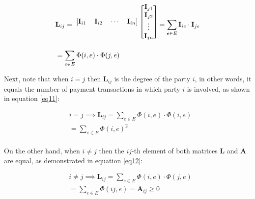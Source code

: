 \documentclass[12pt]{article}
\begin{document}
\begin{multicols}{2}
\begin{equation} \label{eq10}
    \begin{split}
    & \textbf{L}_{ij} = \begin{blockarray}{cccc}
    \begin{block}{[cccc]}
    \textbf{I}_{i1} & \textbf{I}_{i2} & \cdots & \textbf{I}_{in} \\ \end{block}
    \end{blockarray}
    \begin{blockarray}{c}
    \begin{block}{[c]}
    \textbf{I}_{j1} \\
    \textbf{I}_{j2} \\
    \vdots \\
    \textbf{I}_{jn} \\
    \end{block}
    \end{blockarray} = \sum_{e \in E} \textbf{I}_{ie} \cdot \textbf{I}_{je} \\
    & = \sum_{e \in E} \Phi(i, e) \cdot \Phi(j, e) \\
    \end{split}
\end{equation}

Next, note that when $i = j$ then $\textbf{L}_{ij}$ is the degree of the party $i$, in other words, it equals the number of payment transactions in which party $i$ is involved, as shown in equation \ref{eq11}:

\begin{equation} \label{eq11}
    \begin{split}
        & i = j \implies \textbf{L}_{ij} = \sum_{e \in E} \Phi(i, e) \cdot \Phi(i, e) \\
        & = \sum_{e \in E} \Phi(i, e)^2 \\
    \end{split}
\end{equation}

On the other hand, when $i \neq j$ then the $ij$-th element of both matrices $\textbf{L}$ and $\textbf{A}$ are equal, as demonstrated in equation \ref{eq12}:

\begin{equation} \label{eq12}
    \begin{split}
        & i \neq j \implies \textbf{L}_{ij} = \sum_{e \in E} \Phi(i, e) \cdot \Phi(j, e) \\
        & = \sum_{e \in E} \Phi(ij, e) = \textbf{A}_{ij} \geq 0 \\
    \end{split}
\end{equation}


\end{multicols}
\end{document}
